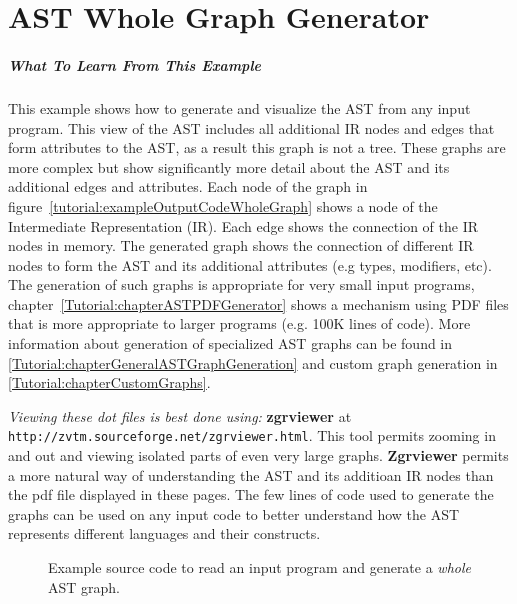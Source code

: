 \chapter{AST Whole Graph Generator}
\label{Tutorial:chapterASTWholeGraphGenerator}

\paragraph{What To Learn From This Example}
This example shows how to generate and visualize the AST from any input program.
This view of the AST includes all additional IR nodes and edges that form attributes to
the AST, as a result this graph is not a tree.  These graphs are more complex but
show significantly more detail about the AST and its additional edges and attributes.
Each node of the graph in figure~\ref{tutorial:exampleOutputCodeWholeGraph} shows
a node of the Intermediate Representation (IR).  Each edge shows the connection
of the IR nodes in memory. The generated graph shows the connection of different 
IR nodes to form the AST and its additional attributes (e.g types, modifiers, etc).  
The generation of such graphs is appropriate for very small 
input programs, chapter~\ref{Tutorial:chapterASTPDFGenerator} shows a mechanism 
using PDF files that is more appropriate to larger programs (e.g. 100K lines of code).
More information about generation of specialized AST graphs can be found in 
\ref{Tutorial:chapterGeneralASTGraphGeneration} and custom graph generation in
\ref{Tutorial:chapterCustomGraphs}.

   {\em Viewing these dot files is best done using:} {\bf zgrviewer} at 
{\tt http://zvtm.sourceforge.net/zgrviewer.html}.  This tool permits zooming
in and out and viewing isolated parts of even very large graphs. {\bf Zgrviewer} permits 
a more natural way of understanding the AST and its additioan IR nodes than the 
pdf file displayed in these pages.  The few lines of code used to generate the
graphs can be used on any input code to better understand how the AST represents
different languages and their constructs.

\begin{figure}[!h]
{\indent
{\mySmallFontSize

\begin{latexonly}
   
\end{latexonly}

\begin{htmlonly}
   
\end{htmlonly}

}
}
\caption{Example source code to read an input program and generate a {\em whole} AST graph.}
\label{Tutorial:exampleASTWholeGraphGenerator}
\end{figure}

